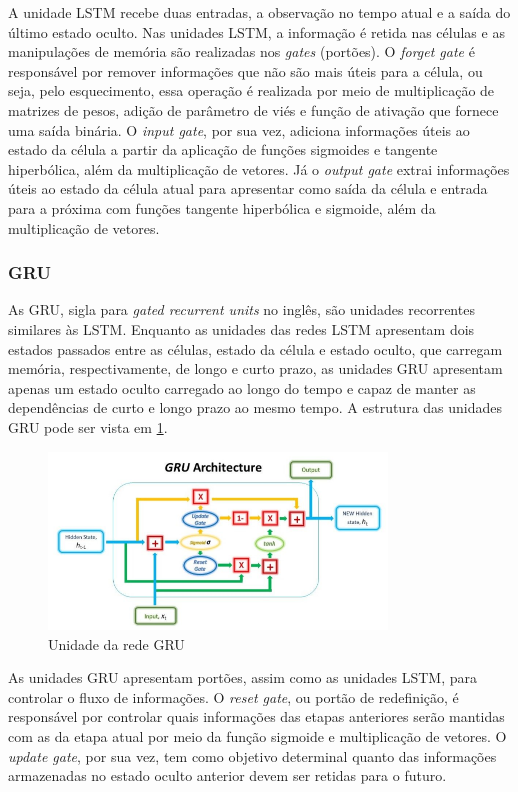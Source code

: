 A unidade LSTM recebe duas entradas, a observação no tempo atual e a saída do 
último estado oculto. Nas unidades LSTM, a informação é retida nas células e as manipulações de memória 
são realizadas nos \textit{gates} (portões). O \textit{forget gate} é responsável
por remover informações que não são mais úteis para a célula, ou seja, pelo 
esquecimento, essa operação é realizada por meio de multiplicação de matrizes 
de pesos, adição de parâmetro de viés e função de ativação que fornece uma saída binária. 
O \textit{input gate}, por sua vez, adiciona informações úteis ao estado da célula
a partir da aplicação de funções sigmoides e tangente hiperbólica, além da multiplicação de vetores. 
Já o \textit{output gate} extrai informações úteis ao estado da célula atual 
para apresentar como saída da célula e entrada para a próxima com funções tangente
hiperbólica e sigmoide, além da multiplicação de vetores. \cite{deeplearningbook}

\subsubsection{GRU}

As GRU, sigla para \textit{gated recurrent units} no inglês,
são unidades recorrentes similares às LSTM. Enquanto as unidades
das redes LSTM apresentam dois estados passados entre as células, 
estado da célula e estado oculto, que carregam memória, respectivamente,
de longo e curto prazo, as unidades GRU apresentam apenas um 
estado oculto carregado ao longo do tempo e capaz de manter
as dependências de curto e longo prazo ao mesmo tempo. A 
estrutura das unidades GRU pode ser vista em \ref{fig:gru-cell}.

\begin{figure}[H]
  \centering
  \includegraphics[width=9cm]{../figuras/redes/gru-cell.png}
  \caption{Unidade da rede GRU \cite{deeplearningbook}}
  \label{fig:gru-cell}
\end{figure}

As unidades GRU apresentam portões, assim como as unidades LSTM,
para controlar o fluxo de informações. O \textit{reset gate}, ou
portão de redefinição, é responsável por controlar quais informações 
das etapas anteriores serão mantidas com as da etapa atual por meio 
da função sigmoide e multiplicação de vetores. O \textit{update gate},
por sua vez, tem como objetivo determinal quanto das informações
armazenadas no estado oculto anterior devem ser retidas para 
o futuro.


